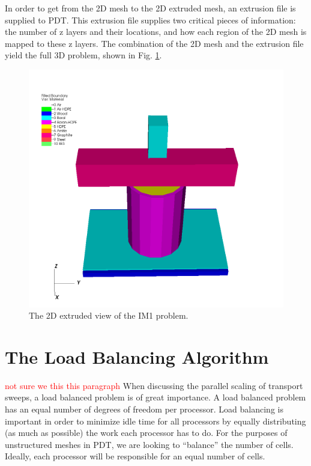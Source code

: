 \documentclass{anstrans}
\newcommand{\tcr}[1]{\textcolor{red}{#1}} %
\begin{document}
In order to get from the 2D mesh to the 2D extruded mesh, an extrusion file is supplied to PDT. This extrusion file supplies two critical pieces of information: the number of z layers and their locations, and how each region of the 2D mesh is mapped to these z layers. The combination of the 2D mesh and the extrusion file yield the full 3D problem, shown in Fig. \ref{IM13D}.

\begin{figure}[H]
\centering
\includegraphics[scale = 0.3]{figures/IM1_3D.png}
\caption{The 2D extruded view of the IM1 problem.}
\label{IM13D}
\end{figure}


\section{The Load Balancing Algorithm}

\tcr{not sure we this this paragraph}
When discussing the parallel scaling of transport sweeps, a load balanced problem is of great importance. A load balanced problem has an equal number of degrees of freedom per processor. Load balancing is important in order to minimize idle time for all processors by equally distributing (as much as possible) the work each processor has to do.  For the purposes of unstructured meshes in PDT, we are looking to ``balance'' the number of cells. Ideally, each processor will be responsible for an equal number of cells. 
\end{document}
